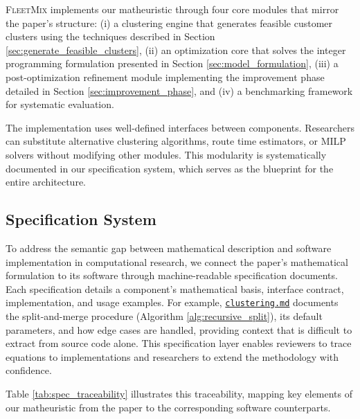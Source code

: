 \documentclass[11pt]{elsarticle}
\theoremstyle{plain}
\begin{document}
\textsc{FleetMix} implements our matheuristic through four core modules that mirror the paper's structure: (i) a clustering engine that generates feasible customer clusters using the techniques described in Section \ref{sec:generate_feasible_clusters}, (ii) an optimization core that solves the integer programming formulation presented in Section \ref{sec:model_formulation}, (iii) a post-optimization refinement module implementing the improvement phase detailed in Section \ref{sec:improvement_phase}, and (iv) a benchmarking framework for systematic evaluation.

The implementation uses well-defined interfaces between components. Researchers can substitute alternative clustering algorithms, route time estimators, or \ac{MILP} solvers without modifying other modules. This modularity is systematically documented in our specification system, which serves as the blueprint for the entire architecture.

\subsection{Specification System}

To address the semantic gap between mathematical description and software implementation in computational research, we connect the paper's mathematical formulation to its software through machine-readable specification documents. Each specification details a component's mathematical basis, interface contract, implementation, and usage examples. For example, \href{https://github.com/ekohan/fleetmix/blob/v1.1.0/docs/specs/clustering.md}{\texttt{clustering.md}} documents the split-and-merge procedure (Algorithm \ref{alg:recursive_split}), its default parameters, and how edge cases are handled, providing context that is difficult to extract from source code alone. This specification layer enables reviewers to trace equations to implementations and researchers to extend the methodology with confidence.

Table \ref{tab:spec_traceability} illustrates this traceability, mapping key elements of our matheuristic from the paper to the corresponding software counterparts.
\end{document}
